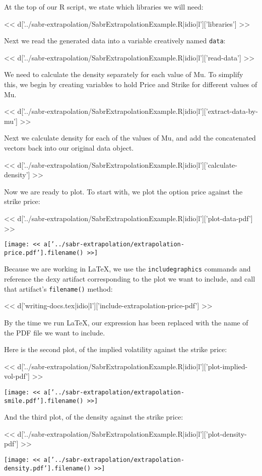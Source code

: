 At the top of our R script, we state which libraries we will need:

<< d['../sabr-extrapolation/SabrExtrapolationExample.R|idio|l']['libraries'] >>

Next we read the generated data into a variable creatively named \verb|data|:

<< d['../sabr-extrapolation/SabrExtrapolationExample.R|idio|l']['read-data'] >>

We need to calculate the density separately for each value of Mu. To simplify
this, we begin by creating variables to hold Price and Strike for different
values of Mu.

<< d['../sabr-extrapolation/SabrExtrapolationExample.R|idio|l']['extract-data-by-mu'] >>

Next we calculate density for each of the values of Mu, and add the
concatenated vectors back into our original data object.

<< d['../sabr-extrapolation/SabrExtrapolationExample.R|idio|l']['calculate-density'] >>

Now we are ready to plot. To start with, we plot the option price against the strike price:

<< d['../sabr-extrapolation/SabrExtrapolationExample.R|idio|l']['plot-data-pdf'] >>

\texttt{[image: << a['../sabr-extrapolation/extrapolation-price.pdf'].filename() >>]}

Because we are working in \LaTeX, we use the \verb|includegraphics| commands
and reference the dexy artifact corresponding to the plot we want to include,
and call that artifact's \verb|filename()| method:

<< d['writing-docs.tex|idio|l']['include-extrapolation-price-pdf'] >>

By the time we run \LaTeX, our expression has been replaced with the name of
the PDF file we want to include.

Here is the second plot, of the implied volatility against the strike price:

<< d['../sabr-extrapolation/SabrExtrapolationExample.R|idio|l']['plot-implied-vol-pdf'] >>

\texttt{[image: << a['../sabr-extrapolation/extrapolation-smile.pdf'].filename() >>]}

And the third plot, of the density against the strike price:

<< d['../sabr-extrapolation/SabrExtrapolationExample.R|idio|l']['plot-density-pdf'] >>

\texttt{[image: << a['../sabr-extrapolation/extrapolation-density.pdf'].filename() >>]}

